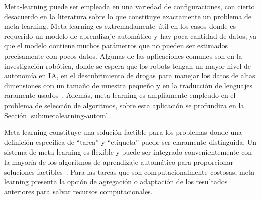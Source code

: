 \documentclass[a4paper,10pt,twocolumn]{article}
\begin{document}
Meta-learning puede ser empleada en una variedad de configuraciones, con cierto desacuerdo en la literatura sobre lo que constituye exactamente un problema de meta-learning. Meta-learning es extremadamente útil en los casos donde es requerido un modelo de aprendizaje automático y hay poca cantidad de datos, ya que el modelo contiene muchos parámetros que no pueden ser estimados precisamente con pocos datos. Algunas de las aplicaciones comunes son en la investigación robótica, donde se espera que los robots tengan un mayor nivel de autonomía en IA, en el descubrimiento de drogas para manejar los datos de altas dimensiones con un tamaño de muestra pequeño y en la traducción de lenguajes raramente usados~\cite{peng2020comprehensive}. Además, meta-learning es ampliamente empleado en el problema de selección de algoritmos, sobre esta aplicación se profundiza en la Sección \ref{sub:metalearning-automl}.

Meta-learning constituye una solución factible para los problemas donde una definición específica de ``tarea'' y ``etiqueta'' puede ser claramente distinguida. Un sistema de meta-learning es flexible y puede ser integrado convenientemente con la mayoría de los algoritmos de aprendizaje automático para proporcionar soluciones factibles~\cite{peng2020comprehensive}. Para las tareas que son computacionalmente costosas, meta-learning presenta la opción de agregación o adaptación de los resultados anteriores para salvar recursos computacionales.
 


\end{document}
